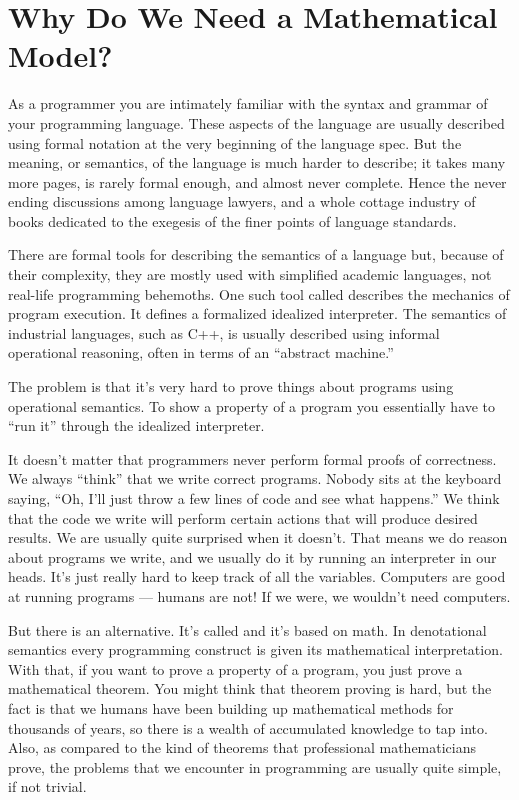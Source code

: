 \section{Why Do We Need a Mathematical Model?}

As a programmer you are intimately familiar with the syntax and grammar
of your programming language. These aspects of the language are usually
described using formal notation at the very beginning of the language
spec. But the meaning, or semantics, of the language is much harder to
describe; it takes many more pages, is rarely formal enough, and almost
never complete. Hence the never ending discussions among language
lawyers, and a whole cottage industry of books dedicated to the exegesis
of the finer points of language standards.

There are formal tools for describing the semantics of a language but,
because of their complexity, they are mostly used with simplified
academic languages, not real-life programming behemoths. One such tool
called  describes the mechanics of program
execution. It defines a formalized idealized interpreter. The semantics
of industrial languages, such as C++, is usually described using
informal operational reasoning, often in terms of an ``abstract
machine.''

The problem is that it's very hard to prove things about programs using
operational semantics. To show a property of a program you essentially
have to ``run it'' through the idealized interpreter.

It doesn't matter that programmers never perform formal proofs of
correctness. We always ``think'' that we write correct programs. Nobody
sits at the keyboard saying, ``Oh, I'll just throw a few lines of code
and see what happens.'' We think that the code we write will perform
certain actions that will produce desired results. We are usually quite
surprised when it doesn't. That means we do reason about programs we
write, and we usually do it by running an interpreter in our heads. It's
just really hard to keep track of all the variables. Computers are good
at running programs --- humans are not! If we were, we wouldn't need
computers.

But there is an alternative. It's called 
and it's based on math. In denotational semantics every programming
construct is given its mathematical interpretation. With that, if you
want to prove a property of a program, you just prove a mathematical
theorem. You might think that theorem proving is hard, but the fact is
that we humans have been building up mathematical methods for thousands
of years, so there is a wealth of accumulated knowledge to tap into.
Also, as compared to the kind of theorems that professional
mathematicians prove, the problems that we encounter in programming are
usually quite simple, if not trivial.

